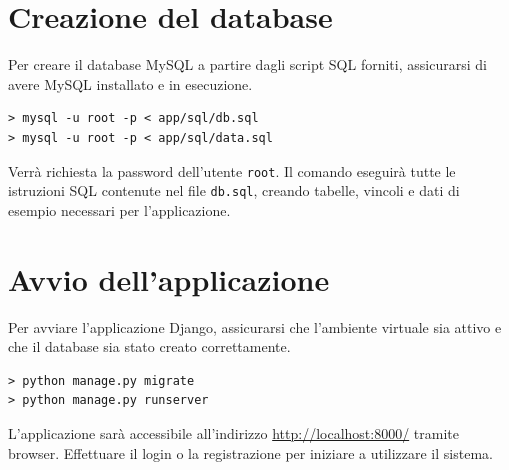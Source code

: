 \documentclass[a4paper,12pt]{report}
\begin{document}
\section{Creazione del database}

Per creare il database MySQL a partire dagli script SQL forniti, assicurarsi di avere MySQL
installato e in esecuzione.

\begin{verbatim}
> mysql -u root -p < app/sql/db.sql
> mysql -u root -p < app/sql/data.sql
\end{verbatim}

Verrà richiesta la password dell'utente \texttt{root}. Il comando eseguirà tutte le
istruzioni SQL contenute nel file \texttt{db.sql}, creando tabelle, vincoli e dati di
esempio necessari per l'applicazione.

\section{Avvio dell'applicazione}

Per avviare l'applicazione Django, assicurarsi che l'ambiente virtuale sia attivo e che il database
sia stato creato correttamente.

\begin{verbatim}
> python manage.py migrate
> python manage.py runserver
\end{verbatim}

L'applicazione sarà accessibile all'indirizzo \url{http://localhost:8000/} tramite browser. Effettuare
il login o la registrazione per iniziare a utilizzare il sistema.
\end{document}
